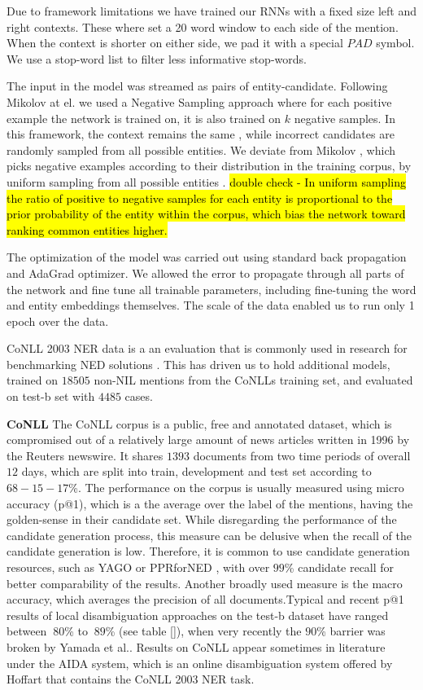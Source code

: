 \documentclass[11pt]{article}
\begin{document}
	Due to framework limitations we have trained our RNNs with a fixed size left and right contexts. These where set a 20 word window to each side of the mention. When the context is shorter on either side, we pad it with a special $PAD$ symbol. We use a stop-word list to filter less informative stop-words.
	
	The input in the model was streamed as pairs of entity-candidate. Following Mikolov at el. \cite{mikolov2013distributed} we used a Negative Sampling approach where for each positive example the network is trained on, it is also trained on $k$ negative samples. In this framework, the context remains the same , while incorrect candidates are randomly sampled from all possible entities. We deviate from Mikolov , which picks negative examples according to their distribution in the training corpus, by uniform sampling from all possible entities . \hl{double check - In uniform sampling the ratio of positive to negative samples for each entity is proportional to the prior probability of the entity within the corpus, which bias the network toward ranking common entities higher.}
	
	The optimization of the model was carried out using standard back propagation and AdaGrad optimizer\cite{duchi2011adaptive}. We allowed the error to propagate through all parts of the network and fine tune all trainable parameters, including fine-tuning the word and entity embeddings themselves. The scale of the data enabled us to run only 1 epoch over the data.
    
    CoNLL 2003 NER data is a an evaluation that is commonly used in research for benchmarking NED solutions \cite{Globerson2016,Hachey2013,Yamada2016,Pershina2015}. This has driven us to hold additional models, trained on $18505$ non-NIL mentions from the CoNLLs training set, and evaluated on test-b set with $4485$ cases. 

	{\bf CoNLL}
	The CoNLL corpus is a public, free and annotated dataset, which is compromised out of a relatively large amount of news articles written in 1996 by the Reuters newswire. It shares $1393$ documents from two time periods of overall $12$ days, which are split into train, development and test set according to $68-15-17$\%. The performance on the corpus is usually measured using micro accuracy (p@1), which is a the average over the label of the mentions, having the golden-sense in their candidate set. While disregarding the performance of the candidate generation process, this measure can be delusive when the recall of the candidate generation is low. Therefore, it is common to use candidate generation resources, such as YAGO \cite{hoffart2011robust} or PPRforNED \cite{Pershina2015}, with over $99$\% candidate recall for better comparability of the results. Another broadly used measure is the macro accuracy, which averages the precision of all documents.Typical and recent p@1 results of local disambiguation approaches on the test-b dataset have ranged between $~80$\% to $~89$\% (see table \ref{}), when very recently the $90$\% barrier was broken by Yamada et al.\cite{Yamada2016}. Results on CoNLL appear sometimes in literature under the AIDA system, which is an online disambiguation system offered by Hoffart that contains the CoNLL 2003 NER task.
	
\end{document}
